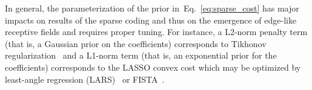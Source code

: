\documentclass[vision,article,submit,oneauthor,pdftex]{Definitions/mdpi}
\newcommand{\coef}{\mathbf{a}} %
\newcommand{\image}{\mathbf{y}} %
\newcommand{\dico}{\Phi} %
\newcommand{\seeEq}[1]{Eq.~\ref{eq:#1}}%
\begin{document}
{%
In general, the parameterization of the prior in~\seeEq{sparse_cost} has major impacts on results of the sparse coding and thus on the emergence of edge-like receptive fields and requires proper tuning. For instance, a L2-norm penalty term (that is, a Gaussian prior on the coefficients) corresponds to Tikhonov regularization~\citep{Tikhonov77} and a L1-norm term (that is, an exponential prior for the coefficients) corresponds to the LASSO convex cost which may be optimized by least-angle regression (LARS)~\citep{efron2004least} or FISTA~\citep{beck2009fast}. %
}
\end{document}
